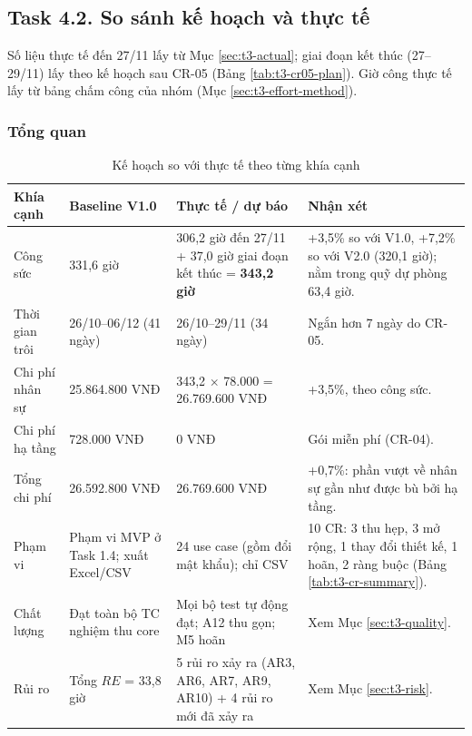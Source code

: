 \subsection{Task 4.2. So sánh kế hoạch và thực tế}
\label{sec:t4-compare}

Số liệu thực tế đến 27/11 lấy từ Mục \ref{sec:t3-actual}; giai đoạn kết thúc (27--29/11) lấy theo kế hoạch sau CR-05 (Bảng \ref{tab:t3-cr05-plan}). Giờ công thực tế lấy từ bảng chấm công của nhóm (Mục \ref{sec:t3-effort-method}).

\subsubsection{Tổng quan}

\begin{table}[H]
\centering\small
\caption{Kế hoạch so với thực tế theo từng khía cạnh}\label{tab:t4-compare}
\begin{tabularx}{\linewidth}{@{}p{.15\linewidth}p{.21\linewidth}p{.25\linewidth}X@{}}
\toprule
\textbf{Khía cạnh} & \textbf{Baseline V1.0} & \textbf{Thực tế / dự báo} & \textbf{Nhận xét}\\\midrule
Công sức & 331,6 giờ & 306,2 giờ đến 27/11 + 37,0 giờ giai đoạn kết thúc = \textbf{343,2 giờ} & +3,5\% so với V1.0, +7,2\% so với V2.0 (320,1 giờ); nằm trong quỹ dự phòng 63,4 giờ.\\
Thời gian trôi & 26/10--06/12 (41 ngày) & 26/10--29/11 (34 ngày) & Ngắn hơn 7 ngày do CR-05.\\
Chi phí nhân sự & 25.864.800 VNĐ & 343,2 $\times$ 78.000 = 26.769.600 VNĐ & +3,5\%, theo công sức.\\
Chi phí hạ tầng & 728.000 VNĐ & 0 VNĐ & Gói miễn phí (CR-04).\\
Tổng chi phí & 26.592.800 VNĐ & 26.769.600 VNĐ & +0,7\%: phần vượt về nhân sự gần như được bù bởi hạ tầng.\\
Phạm vi & Phạm vi MVP ở Task 1.4; xuất Excel/CSV & 24 use case (gồm đổi mật khẩu); chỉ CSV & 10 CR: 3 thu hẹp, 3 mở rộng, 1 thay đổi thiết kế, 1 hoãn, 2 ràng buộc (Bảng \ref{tab:t3-cr-summary}).\\
Chất lượng & Đạt toàn bộ TC nghiệm thu core & Mọi bộ test tự động đạt; A12 thu gọn; M5 hoãn & Xem Mục \ref{sec:t3-quality}.\\
Rủi ro & Tổng $RE$ = 33,8 giờ & 5 rủi ro xảy ra (AR3, AR6, AR7, AR9, AR10) + 4 rủi ro mới đã xảy ra & Xem Mục \ref{sec:t3-risk}.\\
\bottomrule
\end{tabularx}
\end{table}


